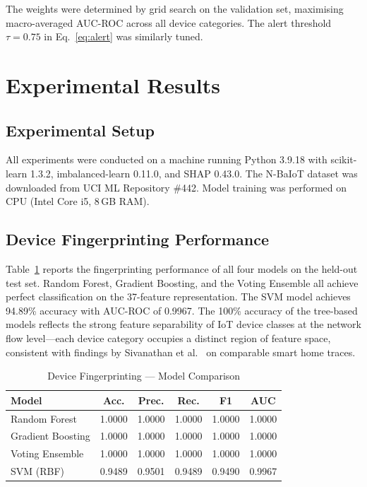 \documentclass[conference]{IEEEtran}
\begin{document}
The weights were determined by grid search on the validation set,
maximising macro-averaged AUC-ROC across all device categories. The alert
threshold $\tau = 0.75$ in Eq.~\eqref{eq:alert} was similarly tuned.

\section{Experimental Results}
\label{sec:results}

\subsection{Experimental Setup}

All experiments were conducted on a machine running Python 3.9.18 with
scikit-learn 1.3.2, imbalanced-learn 0.11.0, and SHAP 0.43.0. The N-BaIoT
dataset was downloaded from UCI ML Repository \#442. Model training was
performed on CPU (Intel Core i5, 8\,GB RAM).

\subsection{Device Fingerprinting Performance}

Table~\ref{tab:finger} reports the fingerprinting performance of all four
models on the held-out test set. Random Forest, Gradient Boosting, and the
Voting Ensemble all achieve perfect classification on the 37-feature
representation. The SVM model achieves 94.89\% accuracy with AUC-ROC of
0.9967. The 100\% accuracy of the tree-based models reflects the strong
feature separability of IoT device classes at the network flow level---each
device category occupies a distinct region of feature space, consistent with
findings by Sivanathan et al.\ \cite{sivanathan2019classifying} on comparable
smart home traces.

\begin{table}[htbp]
\caption{Device Fingerprinting --- Model Comparison}
\label{tab:finger}
\centering
\renewcommand{\arraystretch}{1.2}
\begin{tabular}{l c c c c c}
\toprule
\textbf{Model} & \textbf{Acc.} & \textbf{Prec.} & \textbf{Rec.} & \textbf{F1} & \textbf{AUC} \\
\midrule
Random Forest       & 1.0000 & 1.0000 & 1.0000 & 1.0000 & 1.0000 \\
Gradient Boosting   & 1.0000 & 1.0000 & 1.0000 & 1.0000 & 1.0000 \\
Voting Ensemble     & 1.0000 & 1.0000 & 1.0000 & 1.0000 & 1.0000 \\
SVM (RBF)           & 0.9489 & 0.9501 & 0.9489 & 0.9490 & 0.9967 \\
\bottomrule
\end{tabular}
\end{table}
\end{document}
